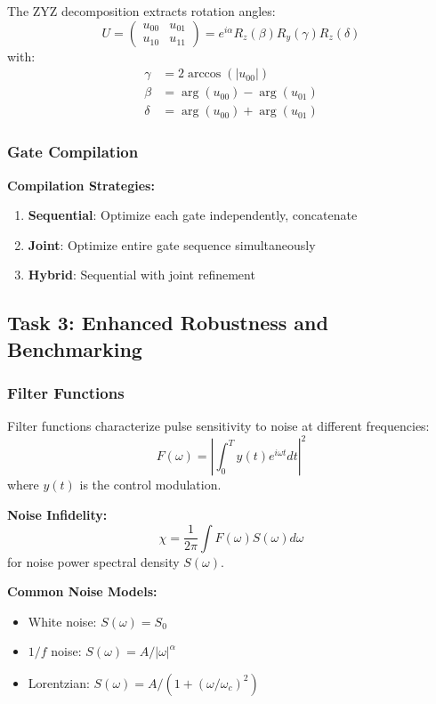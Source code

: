 \documentclass[11pt,a4paper]{article}
\theoremstyle{definition}
\theoremstyle{remark}
\begin{document}
The ZYZ decomposition extracts rotation angles:
\begin{equation}
U = \begin{pmatrix} u_{00} & u_{01} \\ u_{10} & u_{11} \end{pmatrix} = e^{i\alpha}R_z(\beta)R_y(\gamma)R_z(\delta)
\end{equation}
with:
\begin{align}
\gamma &= 2\arccos(|u_{00}|) \\
\beta &= \arg(u_{00}) - \arg(u_{01}) \\
\delta &= \arg(u_{00}) + \arg(u_{01})
\end{align}

\subsubsection{Gate Compilation}

\textbf{Compilation Strategies:}
\begin{enumerate}
    \item \textbf{Sequential}: Optimize each gate independently, concatenate
    \item \textbf{Joint}: Optimize entire gate sequence simultaneously
    \item \textbf{Hybrid}: Sequential with joint refinement
\end{enumerate}

\subsection{Task 3: Enhanced Robustness and Benchmarking}

\subsubsection{Filter Functions}

Filter functions characterize pulse sensitivity to noise at different frequencies:
\begin{equation}
F(\omega) = \left|\int_0^T y(t)e^{i\omega t}dt\right|^2
\end{equation}
where $y(t)$ is the control modulation.

\textbf{Noise Infidelity:}
\begin{equation}
\chi = \frac{1}{2\pi}\int F(\omega)S(\omega)d\omega
\end{equation}
for noise power spectral density $S(\omega)$.

\textbf{Common Noise Models:}
\begin{itemize}
    \item White noise: $S(\omega) = S_0$
    \item $1/f$ noise: $S(\omega) = A/|\omega|^\alpha$
    \item Lorentzian: $S(\omega) = A/(1 + (\omega/\omega_c)^2)$
\end{itemize}
\end{document}
